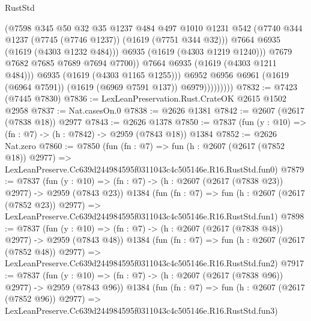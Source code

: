 \begin{lexlean}{RustStd}
\begin{coremodule}
                                (@7598
                                  @345
                                  @50
                                  @32
                                  @35
                                  @1237
                                  @484
                                  @497
                                  @1010
                                  @1231
                                  @542
                                  (@7740 @344 @1237 (@7745 (@7746 @1237)) (@1619 (@7751 @344 @32)))
                                  @7664
                                  @6935
                                  (@1619 (@4303 @1232 @484)))
                                @6935
                                (@1619 (@4303 @1219 @1240)))
                              @7679
                              @7682
                              @7685
                              @7689
                              @7694
                              @7700))
                          @7664
                          @6935
                          (@1619 (@4303 @1211 @484)))
                        @6935
                        (@1619 (@4303 @1165 @1255)))
                      @6952
                      @6956
                      @6961
                      (@1619 (@6964 @7591))
                      (@1619 (@6969 @7591 @137))
                      @6979)))))))))
@7832 := @7423 (@7445 @7830)
@7836 := LexLeanPreservation.Rust.CrateOK @2615 @1502 @2958
@7837 := Nat.casesOn.{0}
@7838 := @2626 @1381
@7842 := @2607 (@2617 (@7838 @18)) @2977
@7843 := @2626 @1378
@7850 := @7837 (fun (y : @10) => (fn : @7) -> (h : @7842) -> @2959 (@7843 @18)) @1384
@7852 := @2626 Nat.zero
@7860 := @7850
    (fun (fn : @7) =>
    fun (h : @2607 (@2617 (@7852 @18)) @2977) =>
    LexLeanPreserve.Cc639d244984595f0311043c4c505146e.R16.RustStd.fun0)
@7879 := @7837
    (fun (y : @10) => (fn : @7) -> (h : @2607 (@2617 (@7838 @23)) @2977) -> @2959 (@7843 @23))
    @1384
    (fun (fn : @7) =>
    fun (h : @2607 (@2617 (@7852 @23)) @2977) =>
    LexLeanPreserve.Cc639d244984595f0311043c4c505146e.R16.RustStd.fun1)
@7898 := @7837
    (fun (y : @10) => (fn : @7) -> (h : @2607 (@2617 (@7838 @48)) @2977) -> @2959 (@7843 @48))
    @1384
    (fun (fn : @7) =>
    fun (h : @2607 (@2617 (@7852 @48)) @2977) =>
    LexLeanPreserve.Cc639d244984595f0311043c4c505146e.R16.RustStd.fun2)
@7917 := @7837
    (fun (y : @10) => (fn : @7) -> (h : @2607 (@2617 (@7838 @96)) @2977) -> @2959 (@7843 @96))
    @1384
    (fun (fn : @7) =>
    fun (h : @2607 (@2617 (@7852 @96)) @2977) =>
    LexLeanPreserve.Cc639d244984595f0311043c4c505146e.R16.RustStd.fun3)

\end{coremodule}
\end{lexlean}

